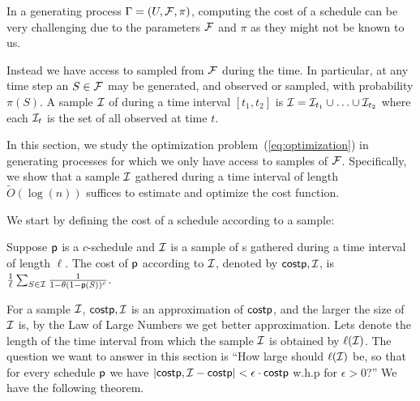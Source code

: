 In a generating process $\Gamma = (U, \mathcal{F}, \pi)$, computing the cost of a
schedule can be very challenging due to the parameters $\mathcal{F}$ and $\pi$ as
they might not be known to us.

Instead we have access to sampled {\ins} from $\mathcal{F}$ during the time. In
particular, at any time step an {\ins} $S\in\mathcal{F}$ may be generated, and
observed or sampled, with probability $\pi(S)$. A sample $\mathcal{I}$ of {\ins}
during a time interval $[t_1, t_2]$ is
$\mathcal{I}=\mathcal{I}_{t_1}\cup\ldots\cup\mathcal{I}_{t_2}$ where each $\mathcal{I}_t$ is the
set of all observed {\ins} at time $t$.

In this section, we study the optimization problem~(\ref{eq:optimization}) in
generating processes for which we only have access to samples of $\mathcal{F}$.
Specifically, we show that a sample $\mathcal{I}$ gathered during a time interval of
length $\tilde O(\log(n))$ suffices to estimate and optimize the cost function.


We start by defining the cost of a schedule according to a sample:

\begin{definition}
	Suppose $\mathsf{p}$ is a $c$-schedule and $\mathcal{I}$ is a sample of {\ins}s
	gathered during a time interval of length $\ell$. The cost of $\mathsf{p}$
	according to $\mathcal{I}$, denoted by $\mathsf{cost}{\mathsf{p},\mathcal{I}}$, is
	$\frac{1}{\ell}\sum_{S\in \mathcal{I}} \frac{1}{1-\theta(1-\mathsf{p}(S))^c}$.
\end{definition}

For a sample $\mathcal{I}$, $\mathsf{cost}{\mathsf{p},\mathcal{I}}$ is an approximation of
$\mathsf{cost}{\mathsf{p}}$, and the larger the size of $\mathcal{I}$ is, by the Law of Large
Numbers we get better approximation. Lets denote the length of the time interval
from which the sample $\mathcal{I}$ is obtained by $\ell(\mathcal{I})$. The question we
want to answer in this section is ``How large should $\ell(\mathcal{I})$ be, so that
for every schedule $\mathsf{p}$ we have $|\mathsf{cost}{\mathsf{p},\mathcal{I}} - \mathsf{cost}{\mathsf{p}}| <
\epsilon\cdot\mathsf{cost}{\mathsf{p}}$ w.h.p for $\epsilon > 0$?'' We have the following theorem.

